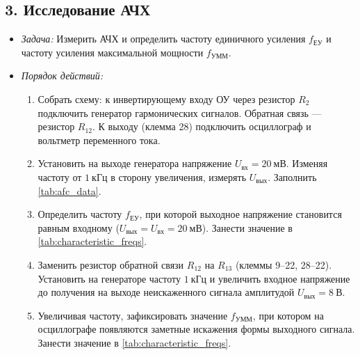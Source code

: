 \subsection*{3. Исследование АЧХ}
\begin{itemize}
    \item \textit{Задача:} Измерить АЧХ и определить частоту единичного усиления $f_{\text{ЕУ}}$ и частоту усиления максимальной мощности $f_{\text{УММ}}$.
    \item \textit{Порядок действий:}
        \begin{enumerate}
            \item Собрать схему: к инвертирующему входу ОУ через резистор $R_2$ подключить генератор гармонических сигналов. Обратная связь --- резистор $R_{12}$. К выходу (клемма 28) подключить осциллограф и вольтметр переменного тока.
            \item Установить на выходе генератора напряжение $U_{\text{вх}} = 20~\text{мВ}$. Изменяя частоту от $1~\text{кГц}$ в сторону увеличения, измерять $U_{\text{вых}}$. Заполнить \cref{tab:afc_data}.
            \item Определить частоту $f_{\text{ЕУ}}$, при которой выходное напряжение становится равным входному ($U_{\text{вых}} = U_{\text{вх}} = 20~\text{мВ}$). Занести значение в \cref{tab:characteristic_freqs}.
            \item Заменить резистор обратной связи $R_{12}$ на $R_{13}$ (клеммы 9--22, 28--22). Установить на генераторе частоту $1~\text{кГц}$ и увеличить входное напряжение до получения на выходе неискаженного сигнала амплитудой $U_{\text{вых}} = 8~\text{В}$.
            \item Увеличивая частоту, зафиксировать значение $f_{\text{УММ}}$, при котором на осциллографе появляются заметные искажения формы выходного сигнала. Занести значение в \cref{tab:characteristic_freqs}.
        \end{enumerate}
\end{itemize}

